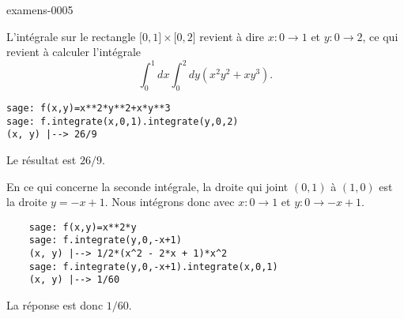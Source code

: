 
\begin{corrige}{examens-0005}


    L'intégrale sur le rectangle \( \mathopen[ 0 , 1 \mathclose]\times \mathopen[ 0 , 2 \mathclose]\) revient à dire \( x\colon 0\to 1\) et \( y\colon 0\to 2\), ce qui revient à calculer l'intégrale
    \begin{equation}
        \int_0^1dx\int_0^2dy(x^2y^2+xy^3).
    \end{equation}
    \begin{verbatim}
sage: f(x,y)=x**2*y**2+x*y**3
sage: f.integrate(x,0,1).integrate(y,0,2)
(x, y) |--> 26/9
    \end{verbatim}
    Le résultat est \( 26/9\).

    En ce qui concerne la seconde intégrale, la droite qui joint \( (0,1)\) à \( (1,0)\) est la droite \( y=-x+1\). Nous intégrons donc avec \( x\colon 0\to 1\) et \( y\colon 0\to -x+1\).
    \begin{verbatim}
    sage: f(x,y)=x**2*y
    sage: f.integrate(y,0,-x+1)
    (x, y) |--> 1/2*(x^2 - 2*x + 1)*x^2
    sage: f.integrate(y,0,-x+1).integrate(x,0,1)
    (x, y) |--> 1/60
    \end{verbatim}
    La réponse est donc \( 1/60\).


\end{corrige}
